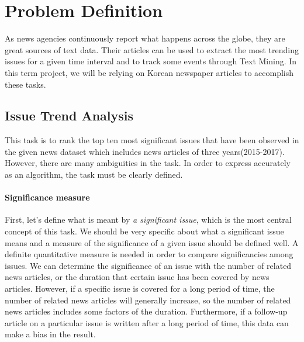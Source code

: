 \documentclass[sigconf,authorversion,nonacm]{acmart}
\begin{document}
\section{Problem Definition}
As news agencies continuously report what happens across the globe, they are great sources of text data. Their articles can be used to extract the most trending issues for a given time interval and to track some events through Text Mining. In this term project, we will be relying on Korean newspaper articles to accomplish these tasks.

\subsection{Issue Trend Analysis}
This task is to rank the top ten most significant issues
that have been observed in the given news dataset
which includes news articles of three years(2015-2017).
However, there are many ambiguities in the task.
In order to express accurately as an algorithm,
the task must be clearly defined.

\paragraph{Significance measure}
First, let's define what is meant by \emph{a significant issue},
which is the most central concept of this task.
We should be very specific about what a significant issue means
and a measure of the significance of a given issue should be defined well.
A definite quantitative measure is needed
in order to compare significancies among issues.
We can determine the significance of an issue
with the number of related news articles,
or the duration that certain issue has been covered by news articles.
However, if a specific issue is covered for a long period of time,
the number of related news articles will generally increase,
so the number of related news articles includes some factors of the duration.
Furthermore, if a follow-up article on a particular issue is written after a long period of time,
this data can make a bias in the result.
\end{document}
